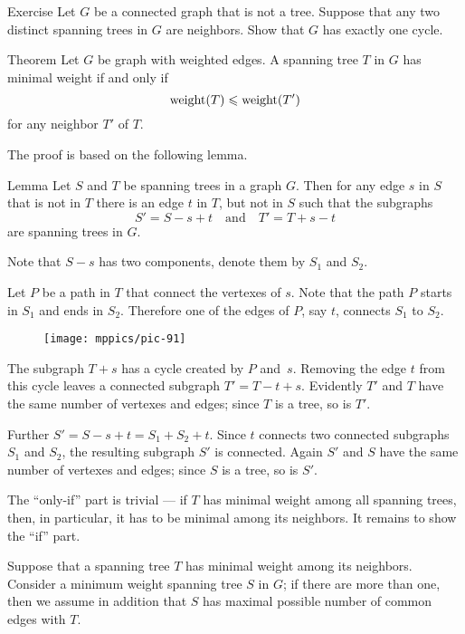\begin{thm}{Exercise}
Let $G$ be a connected graph that is not a tree.
Suppose that any two distinct spanning trees in $G$ are neighbors.
Show that $G$ has exactly one cycle.
\end{thm}

\begin{thm}{Theorem}\label{thm:mst-iff}
Let $G$ be graph with weighted edges.
A spanning tree $T$ in $G$ has minimal weight if and only if
\[\mathop{\rm weight}\nolimits(T)\leqslant \mathop{\rm weight}\nolimits(T')\]
for any neighbor $T'$ of $T$.
\end{thm}

The proof is based on the following lemma.

\begin{thm}{Lemma}
Let $S$ and $T$ be spanning trees in a graph $G$.
Then for any edge $s$ in $S$ that is not in $T$ there is an edge $t$ in $T$, but not in $S$ such that the subgraphs
\[S'=S-s+t\quad\text{and}\quad T'=T+s-t\]
are spanning trees in $G$.
\end{thm}

Note that $S-s$ has two components, denote them by $S_1$ and $S_2$.

Let $P$ be a path in $T$ that connect the vertexes of $s$.
Note that the path $P$ starts in $S_1$ and ends in $S_2$.
Therefore one of the edges of $P$, say $t$, connects $S_1$ to $S_2$.

\begin{figure}[h!]
\vskip-0mm
\centering
\texttt{[image: mppics/pic-91]}
\end{figure}

The subgraph $T+s$ has a cycle created by $P$ and~$s$.
Removing the edge $t$ from this cycle leaves a connected subgraph $T'=T-t+s$.
Evidently $T'$ and $T$ have the same number of vertexes and edges;
since $T$ is a tree, so is $T'$.

Further $S'=S-s+t=S_1+S_2+t$.
Since $t$ connects two connected subgraphs $S_1$ and $S_2$, the resulting subgraph $S'$ is connected.
Again $S'$ and $S$ have the same number of vertexes and edges;
since $S$ is a tree, so is $S'$.
\qeds

 The ``only-if'' part is trivial --- if $T$ has minimal weight among all spanning trees, then, in particular, it has to be minimal among its neighbors. 
It remains to show the ``if'' part.

Suppose that a spanning tree $T$ has minimal weight among its neighbors.
Consider a minimum weight spanning tree $S$ in $G$;
if there are more than one, then
we assume in addition that $S$ has maximal possible number of common edges with $T$. 

